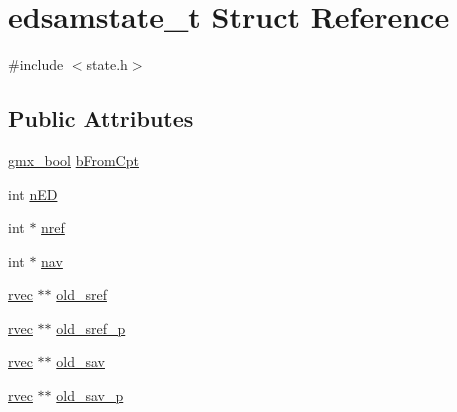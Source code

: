 \hypertarget{structedsamstate__t}{\section{edsamstate\-\_\-t \-Struct \-Reference}
\label{structedsamstate__t}
}


{\ttfamily \#include $<$state.\-h$>$}

\subsection*{\-Public \-Attributes}
\begin{DoxyCompactItemize}
\item 
\hyperlink{include_2types_2simple_8h_a8fddad319f226e856400d190198d5151}{gmx\-\_\-bool} \hyperlink{structedsamstate__t_a851c95aa8fb1595ae17004883e7deb7e}{b\-From\-Cpt}
\item 
int \hyperlink{structedsamstate__t_a36c0b164ac3aadb210e5566ca51b5220}{n\-E\-D}
\item 
int $\ast$ \hyperlink{structedsamstate__t_ac2a17e3d74e1ee51f5ffdaf56ffc210d}{nref}
\item 
int $\ast$ \hyperlink{structedsamstate__t_a4220b0869f4b26b29899c9e77cd294ce}{nav}
\item 
\hyperlink{share_2template_2gromacs_2types_2simple_8h_aa02a552a4abd2f180c282a083dc3a999}{rvec} $\ast$$\ast$ \hyperlink{structedsamstate__t_a8649ba9780e5c51ac4a98ce308787bbb}{old\-\_\-sref}
\item 
\hyperlink{share_2template_2gromacs_2types_2simple_8h_aa02a552a4abd2f180c282a083dc3a999}{rvec} $\ast$$\ast$ \hyperlink{structedsamstate__t_aa5b3cd7ac42ad2a1f38a400c09f5d204}{old\-\_\-sref\-\_\-p}
\item 
\hyperlink{share_2template_2gromacs_2types_2simple_8h_aa02a552a4abd2f180c282a083dc3a999}{rvec} $\ast$$\ast$ \hyperlink{structedsamstate__t_a9b3403c81ec51536f3376eca33b850df}{old\-\_\-sav}
\item 
\hyperlink{share_2template_2gromacs_2types_2simple_8h_aa02a552a4abd2f180c282a083dc3a999}{rvec} $\ast$$\ast$ \hyperlink{structedsamstate__t_af1fa8df393d72adc8510da5ede8adff0}{old\-\_\-sav\-\_\-p}
\end{DoxyCompactItemize}


